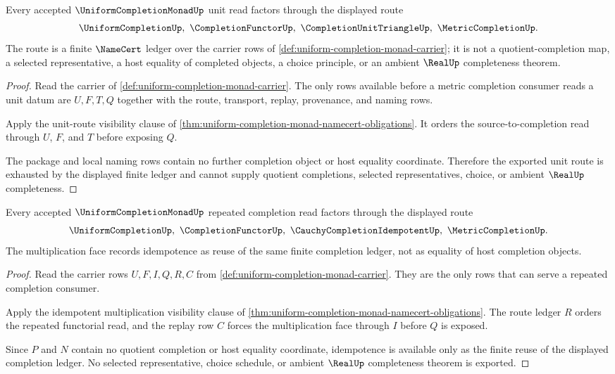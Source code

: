 \begin{theorem}\label{thm:uniform-completion-monad-unit-route}
Every accepted $\UniformCompletionMonadUp$ unit read factors through the displayed route
$$
\UniformCompletionUp,\ \CompletionFunctorUp,\ \CompletionUnitTriangleUp,\ \MetricCompletionUp .
$$
The route is a finite $\NameCert$ ledger over the carrier rows of \autoref{def:uniform-completion-monad-carrier}; it is not a quotient-completion map, a selected representative, a host equality of completed objects, a choice principle, or an ambient $\RealUp$ completeness theorem.
\end{theorem}
\begin{proof}
Read the carrier of \autoref{def:uniform-completion-monad-carrier}. The only rows available before a metric completion consumer reads a unit datum are $U,F,T,Q$ together with the route, transport, replay, provenance, and naming rows.

Apply the unit-route visibility clause of \autoref{thm:uniform-completion-monad-namecert-obligations}. It orders the source-to-completion read through $U$, $F$, and $T$ before exposing $Q$.

The package and local naming rows contain no further completion object or host equality coordinate. Therefore the exported unit route is exhausted by the displayed finite ledger and cannot supply quotient completions, selected representatives, choice, or ambient $\RealUp$ completeness.
\end{proof}

\begin{theorem}\label{thm:uniform-completion-monad-idempotent-multiplication}
Every accepted $\UniformCompletionMonadUp$ repeated completion read factors through the displayed route
$$
\UniformCompletionUp,\ \CompletionFunctorUp,\ \CauchyCompletionIdempotentUp,\ \MetricCompletionUp .
$$
The multiplication face records idempotence as reuse of the same finite completion ledger, not as equality of host completion objects.
\end{theorem}
\begin{proof}
Read the carrier rows $U,F,I,Q,R,C$ from \autoref{def:uniform-completion-monad-carrier}. They are the only rows that can serve a repeated completion consumer.

Apply the idempotent multiplication visibility clause of \autoref{thm:uniform-completion-monad-namecert-obligations}. The route ledger $R$ orders the repeated functorial read, and the replay row $C$ forces the multiplication face through $I$ before $Q$ is exposed.

Since $P$ and $N$ contain no quotient completion or host equality coordinate, idempotence is available only as the finite reuse of the displayed completion ledger. No selected representative, choice schedule, or ambient $\RealUp$ completeness theorem is exported.
\end{proof}

